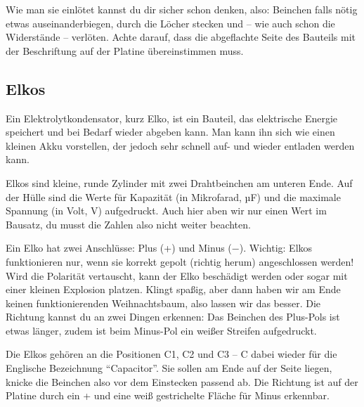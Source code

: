\documentclass[10pt]{article}
\begin{document}
	Wie man sie einlötet kannst du dir sicher schon denken, also: Beinchen falls nötig etwas auseinanderbiegen, durch die Löcher stecken und – wie auch schon die Widerstände – verlöten. Achte darauf, dass die abgeflachte Seite des Bauteils mit der Beschriftung auf der Platine übereinstimmen muss.
		
	\subsection{Elkos}
	\begin{minipage}{0.85\textwidth}
		Ein Elektrolytkondensator, kurz Elko, ist ein Bauteil, das elektrische Energie speichert und bei Bedarf wieder abgeben kann. Man kann ihn sich wie einen kleinen Akku vorstellen, der jedoch sehr schnell auf- und wieder entladen werden kann.
		
		Elkos sind kleine, runde Zylinder mit zwei Drahtbeinchen am unteren Ende. Auf der Hülle sind die Werte für Kapazität (in Mikrofarad, µF) und die maximale Spannung (in Volt, V) aufgedruckt. Auch hier aben wir nur einen Wert im Bausatz, du musst die Zahlen also nicht weiter beachten.
		
		Ein Elko hat zwei Anschlüsse: Plus (+) und Minus (−). Wichtig: Elkos funktionieren nur, wenn sie korrekt gepolt (richtig herum) angeschlossen werden! Wird die Polarität vertauscht, kann der Elko beschädigt werden oder sogar mit einer kleinen Explosion platzen. Klingt spaßig, aber dann haben wir am Ende keinen funktionierenden Weihnachtsbaum, also lassen wir das besser. Die Richtung kannst du an zwei Dingen erkennen: Das Beinchen des Plus-Pols ist etwas länger, zudem ist beim Minus-Pol ein weißer Streifen aufgedruckt.
		
		Die Elkos gehören an die Positionen C1, C2 und C3 – C dabei wieder für die Englische Bezeichnung \enquote{Capacitor}. Sie sollen am Ende auf der Seite liegen, knicke die Beinchen also vor dem Einstecken passend ab. Die Richtung ist auf der Platine durch ein + und eine weiß gestrichelte Fläche für Minus erkennbar.
	\end{minipage}
\end{document}
